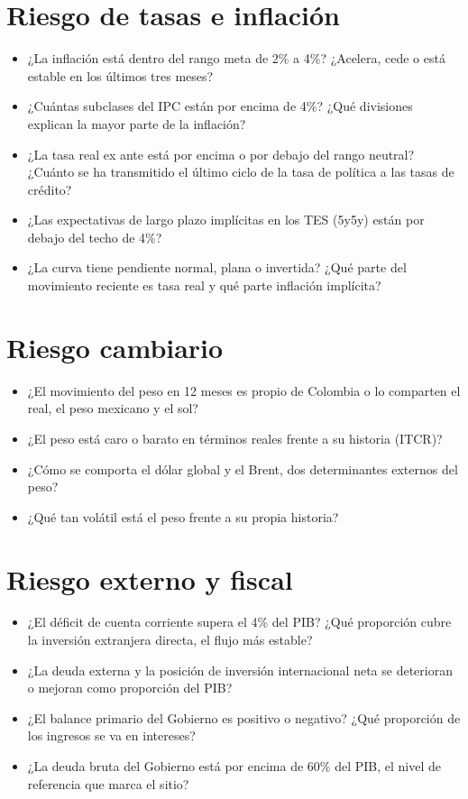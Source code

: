 \section{Riesgo de tasas e inflación}
\begin{itemize}
\item ¿La inflación está dentro del rango meta de 2\% a 4\%? ¿Acelera, cede o está estable en los últimos tres meses?
\item ¿Cuántas subclases del IPC están por encima de 4\%? ¿Qué divisiones explican la mayor parte de la inflación?
\item ¿La tasa real ex ante está por encima o por debajo del rango neutral? ¿Cuánto se ha transmitido el último ciclo
  de la tasa de política a las tasas de crédito?
\item ¿Las expectativas de largo plazo implícitas en los TES (5y5y) están por debajo del techo de 4\%?
\item ¿La curva tiene pendiente normal, plana o invertida? ¿Qué parte del movimiento reciente es tasa real y qué
  parte inflación implícita?
\end{itemize}

\section{Riesgo cambiario}
\begin{itemize}
\item ¿El movimiento del peso en 12 meses es propio de Colombia o lo comparten el real, el peso mexicano y el sol?
\item ¿El peso está caro o barato en términos reales frente a su historia (ITCR)?
\item ¿Cómo se comporta el dólar global y el Brent, dos determinantes externos del peso?
\item ¿Qué tan volátil está el peso frente a su propia historia?
\end{itemize}

\section{Riesgo externo y fiscal}
\begin{itemize}
\item ¿El déficit de cuenta corriente supera el 4\% del PIB? ¿Qué proporción cubre la inversión extranjera directa,
  el flujo más estable?
\item ¿La deuda externa y la posición de inversión internacional neta se deterioran o mejoran como proporción del PIB?
\item ¿El balance primario del Gobierno es positivo o negativo? ¿Qué proporción de los ingresos se va en intereses?
\item ¿La deuda bruta del Gobierno está por encima de 60\% del PIB, el nivel de referencia que marca el sitio?
\end{itemize}

